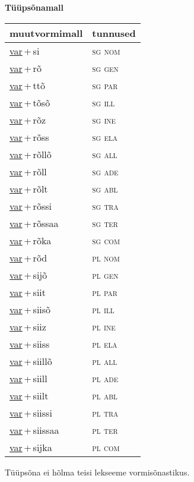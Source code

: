 
\vspace{1.8em}
\begin{minipage}{\textwidth}
\textbf{Tüüpsõnamall \,}\\

\begin{sideways}
\begin{tabular}{l l}
muutvormimall & tunnused \\
\hline
\underline{var}\,+\,si & \textsc{ sg nom } \\
\underline{var}\,+\,rõ & \textsc{ sg gen } \\
\underline{var}\,+\,ttõ & \textsc{ sg par } \\
\underline{var}\,+\,tõsõ & \textsc{ sg ill } \\
\underline{var}\,+\,rõz & \textsc{ sg ine } \\
\underline{var}\,+\,rõss & \textsc{ sg ela } \\
\underline{var}\,+\,rõllõ & \textsc{ sg all } \\
\underline{var}\,+\,rõll & \textsc{ sg ade } \\
\underline{var}\,+\,rõlt & \textsc{ sg abl } \\
\underline{var}\,+\,rõssi & \textsc{ sg tra } \\
\underline{var}\,+\,rõssaa & \textsc{ sg ter } \\
\underline{var}\,+\,rõka & \textsc{ sg com } \\
\underline{var}\,+\,rõd & \textsc{ pl nom } \\
\underline{var}\,+\,sijõ & \textsc{ pl gen } \\
\underline{var}\,+\,siit & \textsc{ pl par } \\
\underline{var}\,+\,siisõ & \textsc{ pl ill } \\
\underline{var}\,+\,siiz & \textsc{ pl ine } \\
\underline{var}\,+\,siiss & \textsc{ pl ela } \\
\underline{var}\,+\,siillõ & \textsc{ pl all } \\
\underline{var}\,+\,siill & \textsc{ pl ade } \\
\underline{var}\,+\,siilt & \textsc{ pl abl } \\
\underline{var}\,+\,siissi & \textsc{ pl tra } \\
\underline{var}\,+\,siissaa & \textsc{ pl ter } \\
\underline{var}\,+\,sijka & \textsc{ pl com } \\
\end{tabular}
\end{sideways}
\label{tab:tüüpsõnamall-varsi}

\end{minipage}

 
\vspace{1em}
\noindent Tüüpsõna ei hõlma teisi lekseeme vormi\-sõnastikus.
